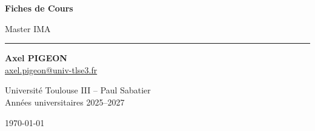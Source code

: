 \begin{titlepage}
    \centering
    \vspace*{3cm}
    {\Huge \bfseries Fiches de Cours \par}
    \vspace{0.8cm}
    {\LARGE Master IMA \par}

    \vspace{1.2cm}
    \rule{0.6\textwidth}{0.4pt}

    \vspace{1.5cm}
    {\large \textbf{Axel PIGEON}}\\
    \vspace{0.2cm}
    {\normalsize \href{mailto:axel.pigeon@univ-tlse3.fr}{axel.pigeon@univ-tlse3.fr}}

    \vfill
    {\Large Université Toulouse III – Paul Sabatier}\\
    \vspace{0.3cm}
    {\large Années universitaires 2025–2027}

    \vspace{1cm}
    {\large \today}
\end{titlepage}
